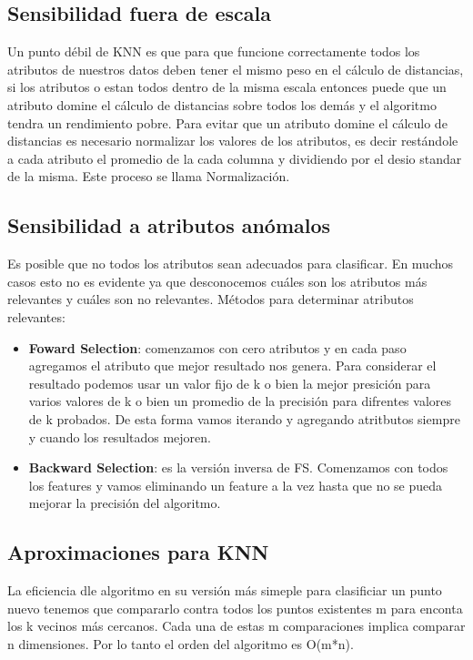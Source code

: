 \documentclass[titlepage,a4paper]{article}
\begin{document}
\subsection*{Sensibilidad fuera de escala}
 Un punto débil de KNN  es que para que funcione correctamente todos los atributos de nuestros datos deben tener el mismo peso en el cálculo de distancias, si los atributos o estan todos dentro de la misma escala entonces puede que un atributo domine el cálculo de distancias sobre todos los demás y el algoritmo tendra un rendimiento pobre. Para evitar que un atributo domine el cálculo de distancias es necesario normalizar los valores de los atributos, es decir restándole a cada atributo el promedio de la cada columna y dividiendo por el desio standar de la misma. Este proceso se llama Normalización. 
 
 \subsection*{Sensibilidad a atributos anómalos}
 Es posible que no todos los atributos sean adecuados para clasificar. En muchos casos esto no es evidente ya que desconocemos cuáles son los atributos más relevantes y cuáles son no relevantes. Métodos para determinar atributos relevantes:  
 \begin{itemize}
 \item\textbf{ Foward Selection}: comenzamos con cero atributos y en cada paso agregamos el atributo que mejor resultado nos genera. Para considerar el resultado podemos usar un valor fijo de k o bien la mejor presición para varios valores de k o bien un promedio de la precisión para difrentes valores de k probados. De esta forma vamos iterando y agregando atritbutos siempre y cuando los resultados mejoren.
 \item \textbf{Backward Selection}: es la versión inversa de FS. Comenzamos con todos los features y vamos eliminando un feature a la vez hasta que no se pueda mejorar la precisión del algoritmo. 
 \end{itemize}
 
 \subsection*{Aproximaciones para KNN}
 La eficiencia dle algoritmo en su versión más simeple para clasificiar un punto nuevo tenemos que compararlo contra todos los puntos existentes m para enconta los k vecinos más cercanos. Cada una de estas m comparaciones implica comparar n dimensiones. Por lo tanto el orden del algoritmo es O(m*n). 
\\
\end{document}
